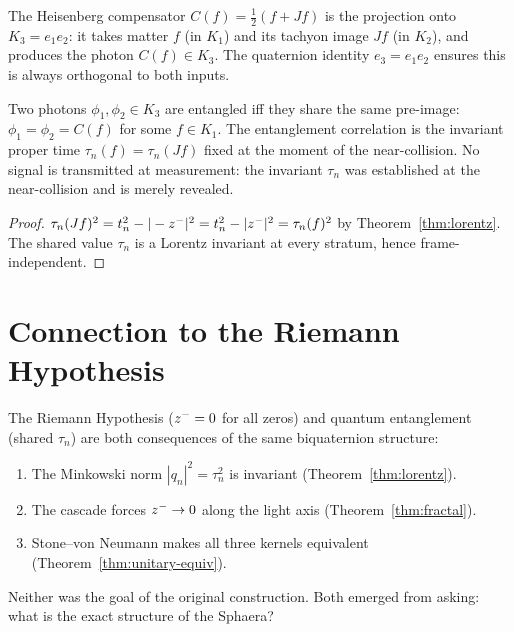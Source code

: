 \begin{proposition}\label{prop:compensator}
The Heisenberg compensator $C(f)=\tfrac{1}{2}(f+Jf)$ is the projection
onto $K_3=e_1 e_2$: it takes matter $f$ (in $K_1$) and its tachyon image
$Jf$ (in $K_2$), and produces the photon $C(f)\in K_3$.
The quaternion identity $e_3=e_1 e_2$ ensures this is always orthogonal
to both inputs.
\end{proposition}

\begin{theorem}
\label{thm:entanglement-shared-time}
Two photons $\phi_1,\phi_2\in K_3$ are entangled iff they share the same
pre-image: $\phi_1=\phi_2=C(f)$ for some $f\in K_1$.
The entanglement correlation is the invariant proper time
$\tau_n(f)=\tau_n(Jf)$ fixed at the moment of the near-collision.
No signal is transmitted at measurement: the invariant $\tau_n$ was
established at the near-collision and is merely revealed.
\end{theorem}

\begin{proof}
$\tau_n(Jf)^2 = t_n^2 - |-z^-|^2 = t_n^2 - |z^-|^2 = \tau_n(f)^2$
by Theorem~\ref{thm:lorentz}.
The shared value $\tau_n$ is a Lorentz invariant at every stratum,
hence frame-independent.
\end{proof}


\section{Connection to the Riemann Hypothesis}
\label{sec:rh}

\begin{remark}
The Riemann Hypothesis ($z^-=0$ for all zeros) and quantum
entanglement (shared $\tau_n$) are both consequences of the same
biquaternion structure:
\begin{enumerate}
  \item The Minkowski norm $|q_n|^2=\tau_n^2$ is invariant
        (Theorem~\ref{thm:lorentz}).
  \item The cascade forces $z^-\to 0$ along the light axis
        (Theorem~\ref{thm:fractal}).
  \item Stone--von Neumann makes all three kernels equivalent
        (Theorem~\ref{thm:unitary-equiv}).
\end{enumerate}
Neither was the goal of the original construction.
Both emerged from asking: what is the exact structure of the Sphaera?
\end{remark}

